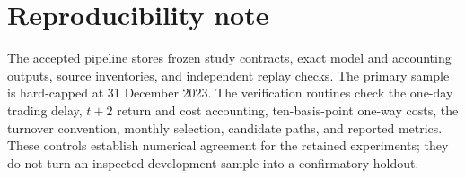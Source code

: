 \documentclass[11pt]{article}
\begin{document}
\section{Reproducibility note}
\label{app:repro}

The accepted pipeline stores frozen study contracts, exact model and accounting
outputs, source inventories, and independent replay checks. The primary sample is
hard-capped at 31 December 2023. The verification routines check the one-day
trading delay, $t+2$ return and cost accounting, ten-basis-point one-way costs,
the turnover convention, monthly selection, candidate paths, and reported
metrics. These controls establish numerical agreement for the retained
experiments; they do not turn an inspected development sample into a confirmatory
holdout.



\end{document}
